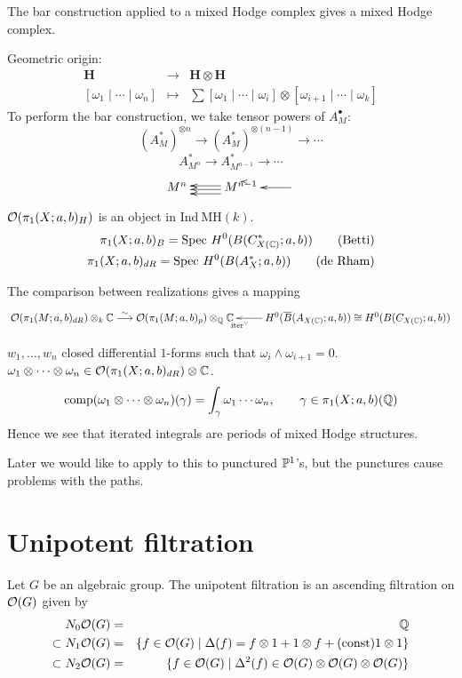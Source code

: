 \begin{prop}
The bar construction applied to a mixed Hodge complex gives a mixed Hodge complex.
\end{prop}
Geometric origin:
\[
\begin{array}{rcl}
\mathbf{H} & \to & \mathbf{H} \otimes \mathbf{H} \\
\textrm{$[\omega_1 \mid \cdots \mid \omega_n]$} & \mapsto & \sum \textrm{$[\omega_1 \mid \cdots \mid \omega_i] \otimes [\omega_{i+1} \mid \cdots \mid \omega_k]$}
\end{array}
\]
To perform the bar construction, we take tensor powers of $A_M^{\bullet}$:
\[
(A_M^*)^{\otimes n} \to (A_M^*)^{\otimes (n-1)} \to \cdots
\]
\[
A^*_{M^n} \to A^*_{M^{n-1}} \to \cdots
\]
\[
\xymatrix{
M^n & M^{n-1} \ar@<0.5em>[l] \ar@<0.15em>[l] \ar@<-0.15em>[l] \ar@<-0.5em> & \ar[l]
}
\]

$\mathcal{O}(\pi_1(X;a,b)_H)$ is an object in $\mathrm{Ind~} \mathrm{MH}(k)$.
\begin{eqnarray*}
\pi_1(X;a,b)_B = \mathrm{Spec}~ H^0(B(C^*_{X(\mathbb{C})}; a,b)) \qquad \textrm{(Betti)} \\
\pi_1(X;a,b)_{dR} = \mathrm{Spec}~ H^0(B(A_X^*; a,b)) \qquad \textrm{(de Rham)}
\end{eqnarray*}

The comparison between realizations gives a mapping
\[
\xymatrix{
\cO(\pi_1(M;a,b)_{dR}) \otimes_k \C \isom \cO(\pi_1(M;a,b)_{p}) \otimes_{\Q} \C & H^0(\overline{B}(A_{X(\C)}; a,b)) \cong H^0(B(C_{X(\C)};a,b)) \ar[l]^{\mathrm{iter}^{\vee}}
}
\]

$w_1, \ldots, w_n$ closed differential $1$-forms such that $\omega_i \wedge \omega_{i+1} = 0$. $\omega_1 \otimes \cdots \otimes \omega_n \in \mathcal{O}(\pi_1(X;a,b)_{dR}) \otimes \mathbb{C}$.
\[
\mathrm{comp}(\omega_1 \otimes \cdots \otimes \omega_n)(\gamma) = \int_{\gamma} \omega_1 \cdots \omega_n, \qquad \gamma \in \pi_1(X;a,b)(\mathbb{Q})
\]
Hence we see that iterated integrals are periods of mixed Hodge structures.

Later we would like to apply to this to punctured $\mathbb{P}^1$'s, but the punctures cause problems with the paths.

\section{Unipotent filtration}

\begin{defn}
Let $G$ be an algebraic group. The unipotent filtration is an ascending filtration on $\mathcal{O}(G)$ given by
\begin{eqnarray*}
N_0 \mathcal{O}(G) & = & \mathbb{Q} \\
\subset N_1 \mathcal{O}(G) & = & \{ f \in \mathcal{O}(G) \mid \Delta(f) = f \otimes 1 + 1 \otimes f + (\textrm{const}) 1 \otimes 1 \} \\
\subset N_2 \mathcal{O}(G) & = & \{ f \in \mathcal{O}(G) \mid \Delta^2(f) \in \mathcal{O}(G) \otimes \mathcal{O}(G) \otimes \mathcal{O}(G) \}
\end{eqnarray*}
\end{defn}

